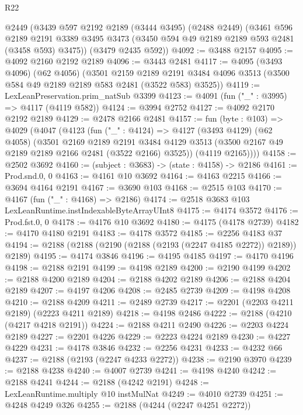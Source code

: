 \begin{lexlean}{R22}
\begin{coremodule}
    @2449
    (@3439
      @597
      @2192
      @2189
      (@3444 @3495)
      (@2488 @2449)
      (@3461
        @596
        @2189
        @2191
        @3389
        @3495
        @3473
        (@3450 @594 @49 @2189 @2189 @593 @2481 (@3458 @593) @3475))
      (@3479 @2435 @592))
@4092 := @3488 @2157
@4095 := @4092 @2160 @2192 @2189
@4096 := @3443 @2481
@4117 := @4095
    (@3493 @4096)
    (@62 @4056)
    (@3501
      @2159
      @2189
      @2191
      @3484
      @4096
      @3513
      (@3500 @584 @49 @2189 @2189 @583 @2481 (@3522 @583) @3525))
@4119 := LexLeanPreservation.prim_natSub @3399
@4123 := @4091 (fun ("_" : @3995) => @4117 (@4119 @582))
@4124 := @3994 @2752
@4127 := @4092 @2170 @2192 @2189
@4129 := @2478 @2166 @2481
@4157 := fun (byte : @103) =>
  @4029
    (@4047
      (@4123
        (fun ("_" : @4124) =>
        @4127
          (@3493 @4129)
          (@62 @4058)
          (@3501
            @2169
            @2189
            @2191
            @3484
            @4129
            @3513
            (@3500 @2167 @49 @2189 @2189 @2166 @2481 (@3522 @2166) @3525))
          (@4119 @2165))))
@4158 := @2502 @3692
@4160 := (subject : @3683) -> (state : @4158) -> @2186
@4161 := Prod.snd.{0, 0}
@4163 := @4161 @10 @3692
@4164 := @4163 @2215
@4166 := @3694 @4164 @2191
@4167 := @3690 @103
@4168 := @2515 @103
@4170 := @4167 (fun ("_" : @4168) => @2186)
@4174 := @2518 @3683 @103 LexLeanRuntime.instIndexableByteArrayUInt8
@4175 := @4174 @3572
@4176 := Prod.fst.{0, 0}
@4178 := @4176 @10 @3692
@4180 := @4175 (@4178 @2739)
@4182 := @4170 @4180 @2191
@4183 := @4178 @3572
@4185 := @2256 @4183 @37
@4194 := @2188 (@2188 (@2190 (@2188 (@2193 (@2247 @4185 @2272)) @2189)) @2189)
@4195 := @4174 @3846
@4196 := @4195 @4185
@4197 := @4170 @4196
@4198 := @2188 @2191
@4199 := @4198 @2189
@4200 := @2190 @4199
@4202 := @2188 @4200 @2189
@4204 := @2188 @4202 @2189
@4206 := @2188 @4204 @2189
@4207 := @4197 @4206
@4208 := @2485 @2739
@4209 := @4198 @4208
@4210 := @2188 @4209
@4211 := @2489 @2739
@4217 := @2201 (@2203 @4211 @2189) (@2223 @4211 @2189)
@4218 := @4198 @2486
@4222 := @2188 (@4210 (@4217 @4218 @2191))
@4224 := @2188 @4211 @2490
@4226 := @2203 @4224 @2189
@4227 := @2201 @4226
@4229 := @2223 @4224 @2189
@4230 := @4227 @4229
@4231 := @4178 @3846
@4232 := @2256 @4231
@4233 := @4232 @66
@4237 := @2188 (@2193 (@2247 @4233 @2272))
@4238 := @2190 @3970
@4239 := @2188 @4238
@4240 := @4007 @2739
@4241 := @4198 @4240
@4242 := @2188 @4241
@4244 := @2188 (@4242 @2191)
@4248 := LexLeanRuntime.multiply @10 instMulNat
@4249 := @4010 @2739
@4251 := @4248 @4249 @326
@4255 := @2188 (@4244 (@2247 @4251 @2272))

\end{coremodule}
\end{lexlean}
